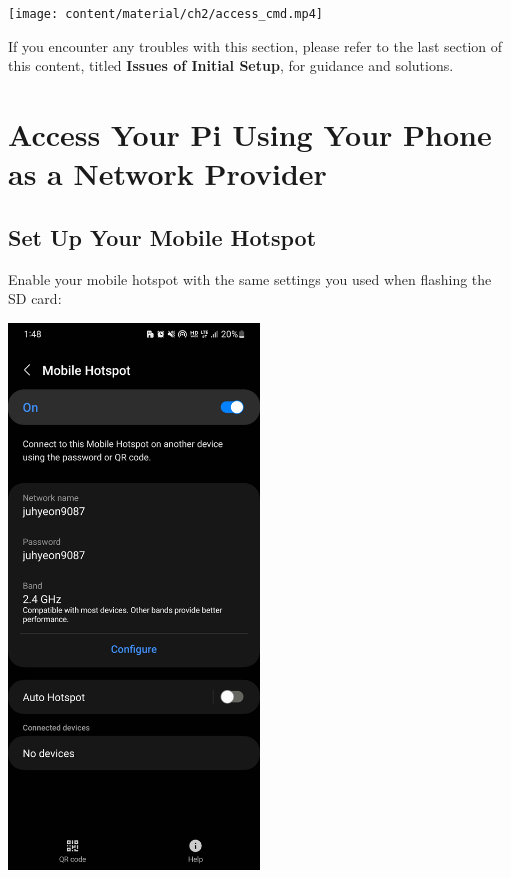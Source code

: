 \documentclass[
  letterpaper,
]{scrbook}
\begin{document}
\texttt{[image: content/material/ch2/access\_cmd.mp4]}

\begin{tcolorbox}[enhanced jigsaw, left=2mm, coltitle=black, colframe=quarto-callout-note-color-frame, bottomrule=.15mm, colback=white, bottomtitle=1mm, breakable, colbacktitle=quarto-callout-note-color!10!white, titlerule=0mm, toptitle=1mm, arc=.35mm, rightrule=.15mm, opacityback=0, title=\textcolor{quarto-callout-note-color}{\faInfo}\hspace{0.5em}{Note}, toprule=.15mm, leftrule=.75mm, opacitybacktitle=0.6]

If you encounter any troubles with this section, please refer to the
last section of this content, titled \textbf{Issues of Initial Setup},
for guidance and solutions.

\end{tcolorbox}

\hypertarget{sec-way2}{%
\section{Access Your Pi Using Your Phone as a Network
Provider}\label{sec-way2}}

\hypertarget{set-up-your-mobile-hotspot}{%
\subsection{Set Up Your Mobile
Hotspot}\label{set-up-your-mobile-hotspot}}

Enable your mobile hotspot with the same settings you used when flashing
the SD card:

\includegraphics[width=0.5\textwidth,height=\textheight]{content/material/ch2/hotspot_default.jpg}
\end{document}
